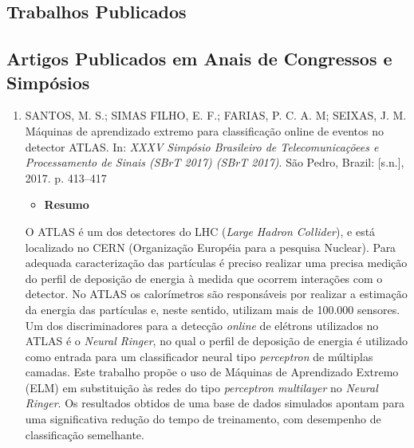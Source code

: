 \begin{apendicesenv}
%
\partapendices
%
\chapter{Trabalhos Publicados}\label{chap:apendice1}
%
\section{Artigos Publicados em Anais de Congressos e Simpósios}
\begin{enumerate}
	\item SANTOS, M. S.; SIMAS FILHO, E. F.; FARIAS, P. C. A. M; SEIXAS, J. M. Máquinas de aprendizado extremo para classificação online de eventos no
	detector ATLAS. In: \textit{XXXV Simpósio Brasileiro de Telecomunicaçõees e Processamento de Sinais (SBrT
	2017) (SBrT 2017)}. São Pedro, Brazil: [s.n.], 2017. p. 413–417
    \begin{itemize}
    	\item \textbf{Resumo}
    \end{itemize}
	
	O ATLAS é um dos detectores do LHC (\textit{Large Hadron Collider}), e está localizado no CERN (Organização Européia para a pesquisa Nuclear). Para adequada caracterização das partículas é preciso realizar uma precisa medição do perfil de deposição de energia à medida que ocorrem interações com o detector. No ATLAS os calorímetros são responsáveis por realizar a estimação da energia das partículas e, neste sentido, utilizam mais de 100.000 sensores. Um dos discriminadores para a detecção \textit{online} de elétrons utilizados no ATLAS é o \textit{Neural Ringer}, no qual o perfil de deposição de energia é utilizado como entrada para um classificador neural tipo \emph{perceptron} de múltiplas camadas. Este trabalho propõe o uso de Máquinas de Aprendizado Extremo (ELM) em substituição às redes do tipo \textit{perceptron multilayer} no \textit{Neural Ringer}. Os resultados obtidos de uma base de dados simulados apontam para uma significativa redução do tempo de treinamento, com desempenho de classificação semelhante.
	

\end{enumerate}
\end{apendicesenv}
